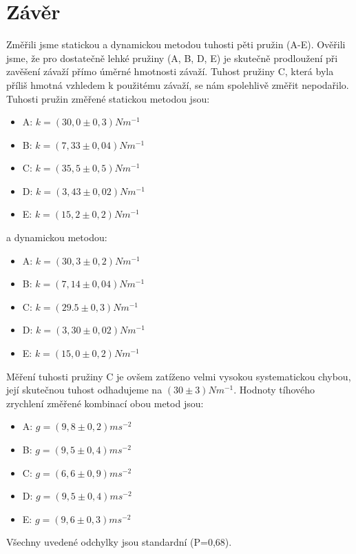 \documentclass{article}
\begin{document}
\section*{Závěr}
Změřili jsme statickou a dynamickou metodou tuhosti pěti pružin (A-E). Ověřili jsme, že pro dostatečně lehké pružiny (A, B, D, E) je skutečně prodloužení při zavěšení závaží přímo úměrné hmotnosti závaží. Tuhost pružiny C, která byla příliš hmotná vzhledem k použitému závaží, se nám spolehlivě změřit nepodařilo. Tuhosti pružin změřené statickou metodou jsou:
\begin{itemize}
\item A: $k=(30,0 \pm 0,3) Nm^{-1}$
\item B: $k=(7,33 \pm 0,04) Nm^{-1}$
\item C: $k=(35,5 \pm 0,5) Nm^{-1}$
\item D: $k=(3,43 \pm 0,02) Nm^{-1}$
\item E: $k=(15,2 \pm 0,2) Nm^{-1}$
\end{itemize}
a dynamickou metodou:
\begin{itemize}
\item A: $k=(30,3 \pm 0,2) Nm^{-1}$
\item B: $k=(7,14 \pm 0,04) Nm^{-1}$
\item C: $k=(29.5 \pm 0,3) Nm^{-1}$
\item D: $k=(3,30 \pm 0,02) Nm^{-1}$
\item E: $k=(15,0 \pm 0,2) Nm^{-1}$
\end{itemize}
Měření tuhosti pružiny C je ovšem zatíženo velmi vysokou systematickou chybou, její skutečnou tuhost odhadujeme na $(30 \pm 3) Nm^{-1}$.
Hodnoty tíhového zrychlení změřené kombinací obou metod jsou:
\begin{itemize}
\item A: $g=(9,8 \pm 0,2) ms^{-2}$
\item B: $g=(9,5 \pm 0,4) ms^{-2}$
\item C: $g=(6,6 \pm 0,9) ms^{-2}$
\item D: $g=(9,5 \pm 0,4) ms^{-2}$
\item E: $g=(9,6 \pm 0,3) ms^{-2}$
\end{itemize}
Všechny uvedené odchylky jsou standardní (P=0,68).



\end{document}
